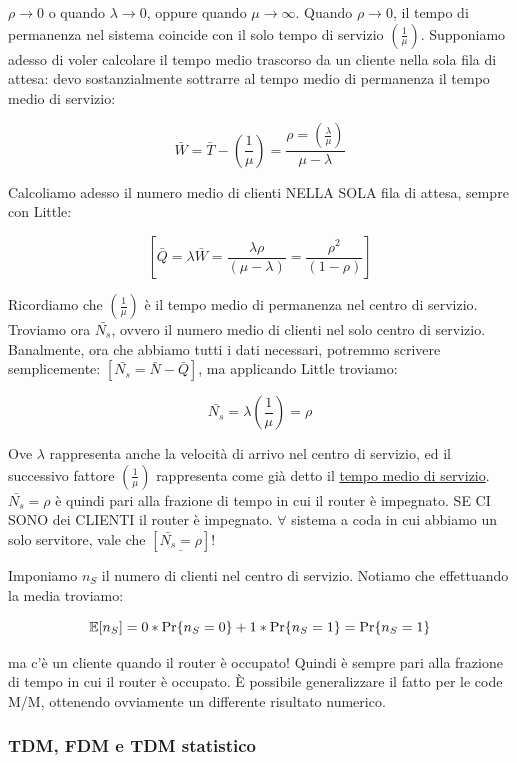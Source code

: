 $\rho\to 0$ o quando $\lambda\to 0$, oppure quando $\mu\to \infty$. Quando $\rho\to 0$, il tempo di permanenza nel sistema coincide con il solo tempo di servizio $(\frac{1}{\mu})$. Supponiamo adesso di voler calcolare il tempo medio trascorso da un cliente nella sola fila di attesa: devo sostanzialmente sottrarre al tempo medio di permanenza il tempo medio di servizio:

\[
	\bar{W} = \bar{T} - (\frac{1}{\mu}) = \frac{\rho = (\frac{\lambda}{\mu})}{\mu-\lambda}
\]

Calcoliamo adesso il numero medio di clienti NELLA SOLA fila di attesa, sempre con Little:

\[
	[\bar{Q} = \lambda\bar{W} = \frac{\lambda\rho}{(\mu-\lambda)} = \frac{\rho^2}{(1-\rho)}]
\]

Ricordiamo che $(\frac{1}{\mu})$ è il tempo medio di permanenza nel centro di servizio. Troviamo ora $\bar{N_s}$, ovvero il numero medio di clienti nel solo centro di servizio. Banalmente, ora che abbiamo tutti i dati necessari, potremmo scrivere semplicemente: $[\bar{N_s} = \bar{N} - \bar{Q}]$, ma applicando Little troviamo:

\[
	\bar{N_s} = \lambda (\frac{1}{\mu}) = \rho
\]

Ove $\lambda$ rappresenta anche la velocità di arrivo nel centro di servizio, ed il successivo fattore $(\frac{1}{\mu})$ rappresenta come già detto il \underline{tempo medio di servizio}. $\bar{N_s} = \rho$ è quindi pari alla frazione di tempo in cui il router è impegnato. SE CI SONO dei CLIENTI il router è impegnato. $\forall$ sistema a coda in cui abbiamo un solo servitore, vale che $[\underline{\bar{N_s} = \rho}]$!

Imponiamo $n_S$ il numero di clienti nel centro di servizio. Notiamo che effettuando la media troviamo:

\[
	\operatorname{\mathbb{E}}[n_S] = 0*\Pr\{n_S = 0\} + 1*\Pr\{n_S = 1\} = \Pr\{n_S = 1\}
\]

ma c'è un cliente quando il router è occupato! Quindi è sempre pari alla frazione di tempo in cui il router è occupato. \`E possibile generalizzare il fatto per le code M/M, ottenendo ovviamente un differente risultato numerico.

\subsubsection{TDM, FDM e TDM statistico}

